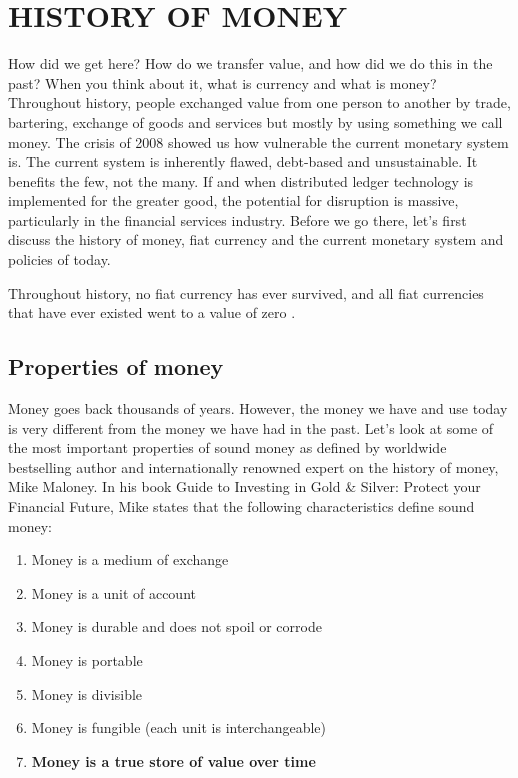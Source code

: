 \chapter{HISTORY OF MONEY}
\label{ch:historyofmoney}

How did we get here? How do we transfer value, and how did we do this in the past? When you think about it, what is currency and what is money? Throughout history, people exchanged value from one person to another by trade, bartering, exchange of goods and services but mostly by using something we call money. The crisis of 2008 showed us how vulnerable the current monetary system is. The current system is inherently flawed, debt-based and unsustainable. It benefits the few, not the many. If and when distributed ledger technology is implemented for the greater good, the potential for disruption is massive, particularly in the financial services industry. Before we go there, let's first discuss the history of money, fiat currency and the current monetary system and policies of today.\bigskip
\bigskip
{}
    \begin{tcolorbox}
    [enhanced,
    title=All Fiat Currencies become Worthless,
    frame style=
    {left color=orange!85!black,right color=yellow!95!black}]
    
      Throughout history, no fiat currency has ever survived, and all fiat currencies that have ever existed went to a value of zero \parencite{thebigreset}.
\end{tcolorbox}
\bigskip


\section{Properties of money}
Money goes back thousands of years. However, the money we have and use today is very different from the money we have had in the past. Let's look at some of the most important properties of sound money as defined by worldwide bestselling author and internationally renowned expert on the history of money, Mike Maloney. In his book Guide to Investing in Gold \& Silver: Protect your Financial Future, Mike states that the following characteristics define sound money:

\begin{enumerate}[label=(\alph*)]
    \setlength\itemsep{0em}
    \item Money is a medium of exchange
    \item Money is a unit of account
    \item Money is durable and does not spoil or corrode
    \item Money is portable
    \item Money is divisible
    \item Money is fungible (each unit is interchangeable)
    \item \textbf{Money is a true store of value over time}
\end{enumerate}


